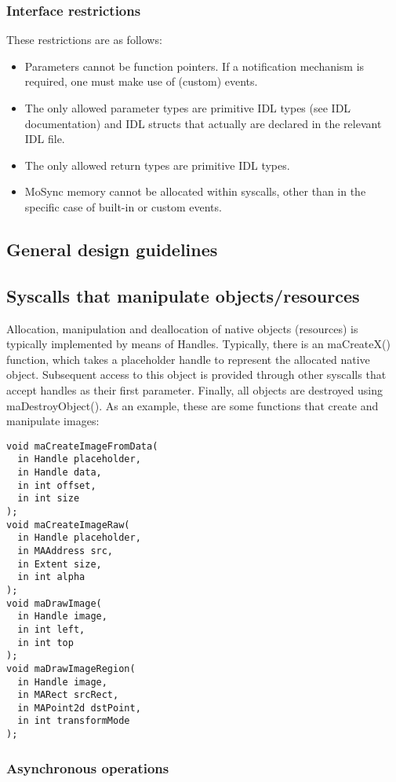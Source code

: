\documentclass {article}
\begin{document}
\subsubsection{Interface restrictions}
These restrictions are as follows:

\begin{itemize}
	\item Parameters cannot be function pointers. If a notification mechanism is required, one must make use of (custom) events.
	\item The only allowed parameter types are primitive IDL types (see IDL documentation) and IDL structs that actually are declared in the relevant IDL file.
	\item The only allowed return types are primitive IDL types.
	\item MoSync memory cannot be allocated within syscalls, other than in the specific case of built-in or custom events.
\end{itemize}

\subsection{General design guidelines}

\subsection{Syscalls that manipulate objects/resources}
Allocation, manipulation and deallocation of native objects (resources) is typically implemented by means of Handles. Typically, there is an maCreateX() function, which takes a placeholder handle to represent the allocated native object. Subsequent access to this object is provided through other syscalls that accept handles as their first parameter. Finally, all objects are destroyed using maDestroyObject(). As an example, these are some functions that create and manipulate images:

\begin{verbatim}
void maCreateImageFromData(
  in Handle placeholder, 
  in Handle data, 
  in int offset, 
  in int size
);
void maCreateImageRaw(
  in Handle placeholder, 
  in MAAddress src, 
  in Extent size, 
  in int alpha
);
void maDrawImage(
  in Handle image, 
  in int left, 
  in int top
);
void maDrawImageRegion(
  in Handle image, 
  in MARect srcRect, 
  in MAPoint2d dstPoint,
  in int transformMode
);
\end{verbatim}


\subsubsection{Asynchronous operations}
\end{document}
